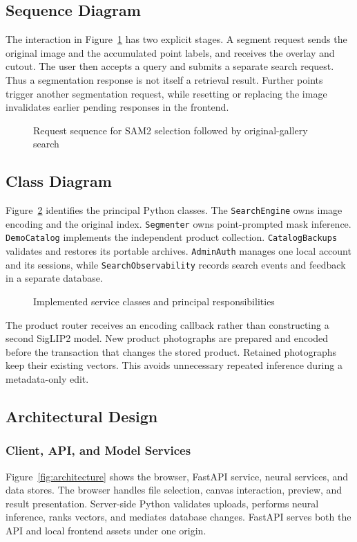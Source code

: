 \subsection{Sequence Diagram}
The interaction in Figure~\ref{fig:sequence} has two explicit stages. A segment
request sends the original image and the accumulated point labels, and receives
the overlay and cutout. The user then accepts a query and submits a separate
search request. Thus a segmentation response is not itself a retrieval result.
Further points trigger another segmentation request, while resetting or replacing
the image invalidates earlier pending responses in the frontend.

\begin{figure}[H]\centering
\caption{Request sequence for SAM2 selection followed by original-gallery search}
\label{fig:sequence}\end{figure}

\subsection{Class Diagram}
Figure~\ref{fig:components} identifies the principal Python classes. The
\texttt{SearchEngine} owns image encoding and the original index.
\texttt{Segmenter} owns point-prompted mask inference. \texttt{DemoCatalog}
implements the independent product collection. \texttt{CatalogBackups} validates
and restores its portable archives. \texttt{AdminAuth} manages one local account
and its sessions, while \texttt{SearchObservability} records search events and
feedback in a separate database.

\begin{figure}[H]\centering
\caption{Implemented service classes and principal responsibilities}
\label{fig:components}\end{figure}

The product router receives an encoding callback rather than constructing a
second SigLIP2 model. New product photographs are prepared and encoded before
the transaction that changes the stored product. Retained photographs keep
their existing vectors. This avoids unnecessary repeated inference during a
metadata-only edit.

\subsection{Architectural Design}
\subsubsection{Client, API, and Model Services}
Figure~\ref{fig:architecture} shows the browser, FastAPI service, neural services,
and data stores. The browser handles file selection, canvas interaction, preview,
and result presentation. Server-side Python validates uploads, performs neural
inference, ranks vectors, and mediates database changes. FastAPI serves both
the API and local frontend assets under one origin.

